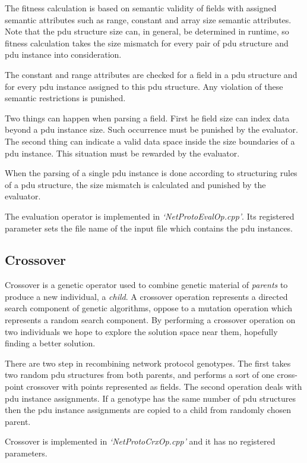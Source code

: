 \documentclass[times, utf8, diplomski]{fer}
\begin{document}
The fitness calculation is based on semantic validity of fields with assigned
semantic attributes such as range, constant and array size semantic attributes.
Note that the pdu structure size can, in general, be determined in runtime, so
fitness calculation takes the size mismatch for every pair of pdu structure and 
pdu instance into consideration.

The constant and range attributes are checked for a field in a pdu structure and
for every pdu instance assigned to this pdu structure. Any violation of these
semantic restrictions is punished.

Two things can happen when parsing a field. First he field size can index data 
beyond a pdu instance size. Such occurrence must be punished by the evaluator.
The second thing can indicate a valid data space inside the size boundaries of
a pdu instance. This situation must be rewarded by the evaluator.

When the parsing of a single pdu instance is done according to structuring rules
of a pdu structure, the size mismatch is calculated and punished by the evaluator.

The evaluation operator is implemented in \emph{`NetProtoEvalOp.cpp'}. Its registered
parameter sets the file name of the input file which contains the pdu instances.

\subsection{Crossover}
Crossover is a genetic operator used to combine genetic material of \emph{parents}
to produce a new individual, a \emph{child}. A crossover operation represents a
directed search component of genetic algorithms, oppose to a mutation operation 
which represents a random search component. By performing a crossover operation 
on two individuals we hope to explore the solution space near them, hopefully 
finding a better solution.

There are two step in recombining network protocol genotypes. The first takes
two random pdu structures from both parents, and performs a sort of one cross-point
crossover with points represented as fields. The second operation deals with
pdu instance assignments. If a genotype has the same number of pdu structures
then the pdu instance assignments are copied to a child from randomly chosen 
parent.

Crossover is implemented in \emph{`NetProtoCrxOp.cpp'} and it has no registered
parameters.
\end{document}
